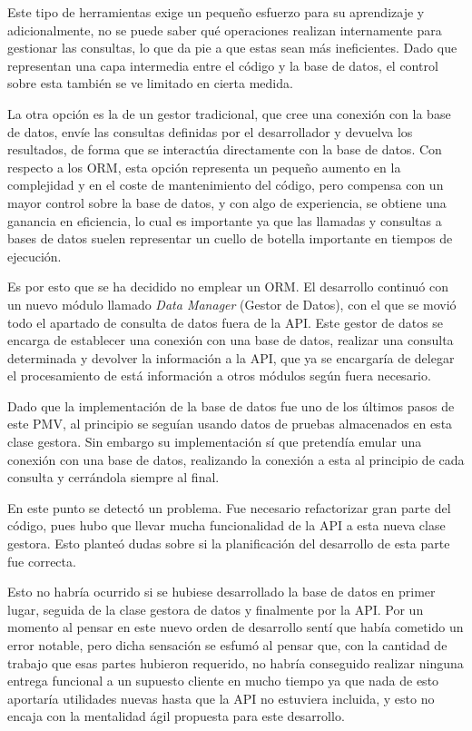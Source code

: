 Este tipo de herramientas exige un pequeño esfuerzo para su aprendizaje y adicionalmente, no se puede saber qué operaciones realizan internamente para gestionar las consultas, lo que da pie a que estas sean más ineficientes. Dado que representan una capa intermedia entre el código y la base de datos, el control sobre esta también se ve limitado en cierta medida.

La otra opción es la de un gestor tradicional, que cree una conexión con la base de datos, envíe las consultas definidas por el desarrollador y devuelva los resultados, de forma que se interactúa directamente con la base de datos. Con respecto a los ORM, esta opción representa un pequeño aumento en la complejidad y en el coste de mantenimiento del código, pero compensa con un mayor control sobre la base de datos, y con algo de experiencia, se obtiene una ganancia en eficiencia, lo cual es importante ya que las llamadas y consultas a bases de datos suelen representar un cuello de botella importante en tiempos de ejecución.

Es por esto que se ha decidido no emplear un ORM. El desarrollo continuó con un nuevo módulo llamado \textit{Data Manager} (Gestor de Datos), con el que se movió todo el apartado de consulta de datos fuera de la API. Este gestor de datos se encarga de establecer una conexión con una base de datos, realizar una consulta determinada y devolver la información a la API, que ya se encargaría de delegar el procesamiento de está información a otros módulos según fuera necesario.

Dado que la implementación de la base de datos fue uno de los últimos pasos de este PMV, al principio se seguían usando datos de pruebas almacenados en esta clase gestora. Sin embargo su implementación sí que pretendía emular una conexión con una base de datos, realizando la conexión a esta al principio de cada consulta y cerrándola siempre al final.

En este punto se detectó un problema. Fue necesario refactorizar gran parte del código, pues hubo que llevar mucha funcionalidad de la API a esta nueva clase gestora. Esto planteó dudas sobre si la planificación del desarrollo de esta parte fue correcta.

Esto no habría ocurrido si se hubiese desarrollado la base de datos en primer lugar, seguida de la clase gestora de datos y finalmente por la API. Por un momento al pensar en este nuevo orden de desarrollo sentí que había cometido un error notable, pero dicha sensación se esfumó al pensar que, con la cantidad de trabajo que esas partes hubieron requerido, no habría conseguido realizar ninguna entrega funcional a un supuesto cliente en mucho tiempo ya que nada de esto aportaría utilidades nuevas hasta que la API no estuviera incluida, y esto no encaja con la mentalidad ágil propuesta para este desarrollo.


